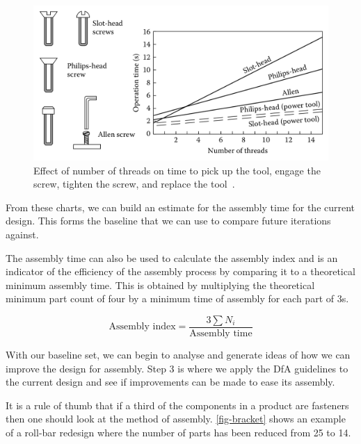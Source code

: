 \begin{figure}
    \centering
    \includegraphics[width=\textwidth]{figs/screwing.png}
    \caption[Effect of number of threads on time to pick up the tool, engage the screw, tighten the screw, and replace the tool]{Effect of number of threads on time to pick up the tool, engage the screw, tighten the screw, and replace the tool~\citep{boothroyd2011}.}\label{fig-screw}
\end{figure}


From these charts, we can build an estimate for the assembly time for the current design. This forms the baseline that we can use to compare future iterations against.

 The assembly time can also be used to calculate the assembly index and is an indicator of the efficiency of the assembly process by comparing it to a theoretical minimum assembly time. This is obtained by multiplying the theoretical minimum part count of four by a minimum time of assembly for each part of 3s. 

\begin{equation}
  \text{Assembly index} = \frac{3\sum{N_i}}{\text{Assembly time}}
\end{equation}


With our baseline set, we can begin to analyse and generate ideas of how we can improve the design for assembly. Step 3 is where we apply the \ac{DfA} guidelines to the current design and see if improvements can be made to ease its assembly.

It is a rule of thumb that if a third of the components in a product are fasteners then one should look at the method of assembly. \cref{fig-bracket} shows an example of a roll-bar redesign where the number of parts has been reduced from 25 to 14.

